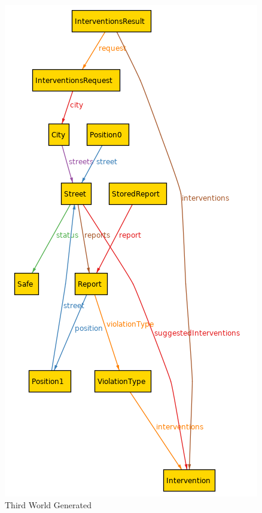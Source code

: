	\begin{figure}[h!]
		\centering
		\includegraphics[scale=0.6]{Files/alloy/world3.png}
		\caption{Third World Generated}
	\end{figure}
	